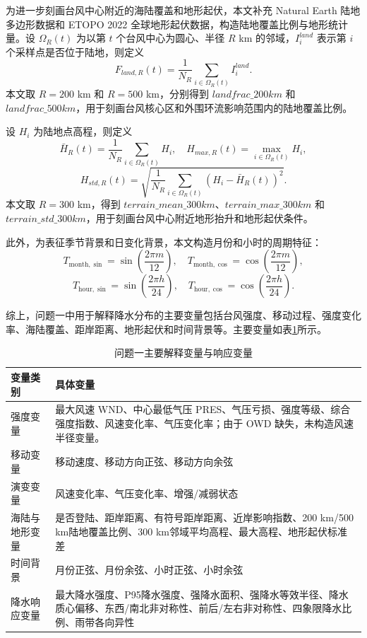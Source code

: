 \documentclass[UTF8,a4paper,zihao=5,fontset=fandol]{ctexart}
\numberwithin{equation}{section}
\numberwithin{figure}{section}
\numberwithin{table}{section}
\begin{document}
为进一步刻画台风中心附近的海陆覆盖和地形起伏，本文补充 Natural Earth 陆地多边形数据和 ETOPO 2022 全球地形起伏数据，构造陆地覆盖比例与地形统计量。设 $\Omega_R(t)$ 为以第 $t$ 个台风中心为圆心、半径 $R$ km 的邻域，$I_i^{land}$ 表示第 $i$ 个采样点是否位于陆地，则定义
\[
F_{land,R}(t)=\frac{1}{N_R}\sum_{i\in\Omega_R(t)}I_i^{land}.
\]
本文取 $R=200$ km 和 $R=500$ km，分别得到 $landfrac\_200km$ 和 $landfrac\_500km$，用于刻画台风核心区和外围环流影响范围内的陆地覆盖比例。

设 $H_i$ 为陆地点高程，则定义
\[
\bar H_R(t)=\frac{1}{N_R}\sum_{i\in\Omega_R(t)}H_i,\quad
H_{max,R}(t)=\max_{i\in\Omega_R(t)}H_i,
\]
\[
H_{std,R}(t)=
\sqrt{\frac{1}{N_R}\sum_{i\in\Omega_R(t)}(H_i-\bar H_R(t))^2}.
\]
本文取 $R=300$ km，得到 $terrain\_mean\_300km$、$terrain\_max\_300km$ 和 $terrain\_std\_300km$，用于刻画台风中心附近地形抬升和地形起伏条件。

此外，为表征季节背景和日变化背景，本文构造月份和小时的周期特征：
\begin{equation}
    T_{\mathrm{month},\sin}=\sin\left(\frac{2\pi m}{12}\right),\quad
    T_{\mathrm{month},\cos}=\cos\left(\frac{2\pi m}{12}\right),
\end{equation}
\begin{equation}
    T_{\mathrm{hour},\sin}=\sin\left(\frac{2\pi h}{24}\right),\quad
    T_{\mathrm{hour},\cos}=\cos\left(\frac{2\pi h}{24}\right).
\end{equation}

综上，问题一中用于解释降水分布的主要变量包括台风强度、移动过程、强度变化率、海陆覆盖、距岸距离、地形起伏和时间背景等。主要变量如表\ref{tab:variables_problem1}所示。

\begin{table}[htbp]
    \centering
    \caption{问题一主要解释变量与响应变量}
    \label{tab:variables_problem1}
    \begin{tabular}{p{}p{}}
        \hline
        变量类别 & 具体变量 \\
        \hline
        强度变量 & 最大风速 WND、中心最低气压 PRES、气压亏损、强度等级、综合强度指数、风速变化率、气压变化率；由于 OWD 缺失，未构造风速半径变量。 \\
        移动变量 & 移动速度、移动方向正弦、移动方向余弦 \\
        演变变量 & 风速变化率、气压变化率、增强/减弱状态 \\
        海陆与地形变量 & 是否登陆、距岸距离、有符号距岸距离、近岸影响指数、200 km/500 km陆地覆盖比例、300 km邻域平均高程、最大高程、地形起伏标准差 \\
        时间背景 & 月份正弦、月份余弦、小时正弦、小时余弦 \\
        降水响应变量 & 最大降水强度、P95降水强度、强降水面积、强降水等效半径、降水质心偏移、东西/南北非对称性、前后/左右非对称性、四象限降水比例、雨带各向异性 \\
        \hline
    \end{tabular}
\end{table}
\end{document}
